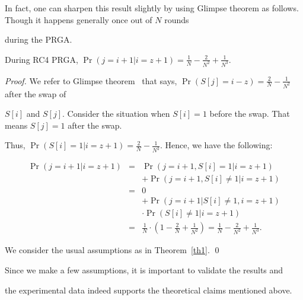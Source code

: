 \documentclass{llncs}
\begin{document}
In fact, one can sharpen this result slightly by using Glimpse theorem as follows. Though it happens generally once out of $N$ rounds

during the PRGA.

\begin{corollary}

During RC4 PRGA, $\Pr(j = i+1 | i = z+1) = \frac{1}{N} - \frac{2}{N^2} + \frac{1}{N^3}$.

\end{corollary}

\begin{proof}

We refer to Glimpse theorem~\cite{jenkins} that says, $\Pr(S[j] = i - z) = \frac{2}{N} - \frac{1}{N^2}$ after the swap of

$S[i]$ and $S[j]$. Consider the situation when $S[i] = 1$ before the swap. That means $S[j] = 1$ after the swap. 

Thus, $\Pr(S[i] = 1 | i = z+1) = \frac{2}{N} - \frac{1}{N^2}$. Hence, we have the following:

\begin{eqnarray*}

\Pr(j = i+1 | i = z+1) & = & \Pr(j = i+1, S[i] = 1 | i = z+1)\\

                       &   & + \Pr(j = i+1, S[i] \neq 1 | i = z+1)\\

             & = & 0\\ 

             &   & + \Pr(j = i+1 | S[i] \neq 1, i = z+1)\\

             &   & \cdot \Pr(S[i] \neq 1 | i = z+1)\\

             & = & \frac{1}{N} \cdot (1 - \frac{2}{N} + \frac{1}{N^2}) = \frac{1}{N} - \frac{2}{N^2} + \frac{1}{N^3}.

\end{eqnarray*} 

We consider the usual assumptions as in Theorem~\ref{th1}. \qed

\end{proof}



Since we make a few assumptions, it is important to validate the results and

the experimental data indeed supports the theoretical claims mentioned above. 
\end{document}
